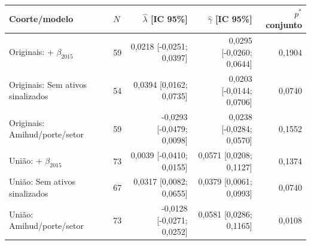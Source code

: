 \begin{tabular}{llrrr}
\toprule
Coorte/modelo & $N$ & $\widehat\lambda$ [IC 95\%] & $\widehat\gamma$ [IC 95\%] & $p^*$ conjunto\\
\midrule
Originais: + $\beta_{2015}$ & 59 & 0,0218 [-0,0251; 0,0397] & 0,0295 [-0,0260; 0,0644] & 0,1904\\
Originais: Sem ativos sinalizados & 54 & 0,0394 [0,0162; 0,0735] & 0,0203 [-0,0144; 0,0706] & 0,0740\\
Originais: Amihud/porte/setor & 59 & -0,0293 [-0,0479; 0,0098] & 0,0238 [-0,0284; 0,0570] & 0,1552\\
União: + $\beta_{2015}$ & 73 & 0,0039 [-0,0410; 0,0155] & 0,0571 [0,0208; 0,1127] & 0,1374\\
União: Sem ativos sinalizados & 67 & 0,0317 [0,0082; 0,0655] & 0,0379 [0,0061; 0,0993] & 0,0740\\
União: Amihud/porte/setor & 73 & -0,0128 [-0,0271; 0,0252] & 0,0581 [0,0286; 0,1165] & 0,0108\\
\bottomrule
\end{tabular}
